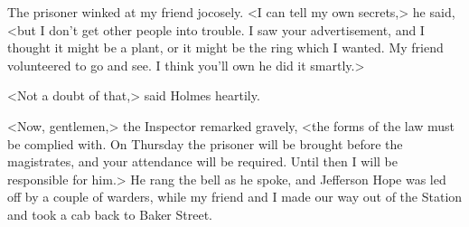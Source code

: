 The prisoner winked at my friend jocosely. <I can tell my own secrets,> he said, <but I don't get other people into trouble. I saw your advertisement, and I thought it might be a plant, or it might be the ring which I wanted. My friend volunteered to go and see. I think you'll own he did it smartly.>

<Not a doubt of that,> said Holmes heartily.

<Now, gentlemen,> the Inspector remarked gravely, <the forms of the law must be complied with. On Thursday the prisoner will be brought before the magistrates, and your attendance will be required. Until then I will be responsible for him.> He rang the bell as he spoke, and Jefferson Hope was led off by a couple of warders, while my friend and I made our way out of the Station and took a cab back to Baker Street.